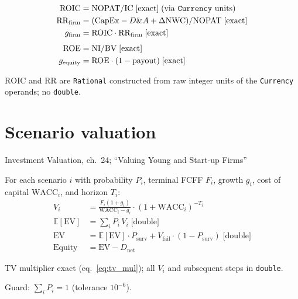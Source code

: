 \documentclass[11pt, a4paper, oneside]{article}
\newcommand{\WACC}{\mathrm{WACC}}
\newcommand{\NOPAT}{\mathrm{NOPAT}}
\newcommand{\ROIC}{\mathrm{ROIC}}
\newcommand{\ROE}{\mathrm{ROE}}
\newcommand{\EV}{\mathrm{EV}}
\newcommand{\IC}{\mathrm{IC}}
\newcommand{\RR}{\mathrm{RR}}
\newcommand{\NWC}{\mathrm{NWC}}
\newcommand{\DA}{D\&A}
\newcommand{\exact}{\;\text{[exact]}}
\newcommand{\dbl}{\;\text{[double]}}
\begin{document}
\begin{align}
  \ROIC &= \NOPAT / \IC \exact\;\text{(via \texttt{Currency} units)}
  \label{eq:roic}\\
  \RR_\text{firm} &= (\mathrm{CapEx} - \DA + \Delta\NWC) / \NOPAT \exact
  \label{eq:rr_firm}\\
  g_\text{firm} &= \ROIC \cdot \RR_\text{firm} \exact
  \label{eq:g_firm}\\[4pt]
  \ROE &= \mathrm{NI} / \mathrm{BV} \exact
  \label{eq:roe}\\
  g_\text{equity} &= \ROE \cdot (1-\mathrm{payout}) \exact
  \label{eq:g_equity2}
\end{align}

\begin{impl}{}
$\ROIC$ and $\RR$ are \texttt{Rational} constructed from raw integer units
of the \texttt{Currency} operands; no \texttt{double}.
\end{impl}

\section{Scenario valuation}
\label{sec:startup}

\begin{damodaran}{Investment Valuation, ch.~24; ``Valuing Young and Start-up Firms''}
\end{damodaran}

For each scenario $i$ with probability $P_i$, terminal FCFF $F_i$,
growth $g_i$, cost of capital $\WACC_i$, and horizon $T_i$:
\begin{align}
  V_i &= \frac{F_i(1+g_i)}{\WACC_i - g_i} \cdot (1+\WACC_i)^{-T_i}
  \label{eq:scenario_vi}\\
  \mathbb{E}[\EV] &= \sum_i P_i\, V_i \dbl
  \label{eq:ev_expected}\\
  \EV &= \mathbb{E}[\EV]\cdot P_\text{surv}
         + V_\text{fail}\cdot(1-P_\text{surv}) \dbl
  \label{eq:ev_adjusted}\\
  \text{Equity} &= \EV - D_\text{net}
\end{align}

TV multiplier exact (eq.~\ref{eq:tv_mul}); all $V_i$ and subsequent steps
in \texttt{double}.

Guard: $\sum_i P_i = 1$ (tolerance $10^{-6}$).

\end{document}
